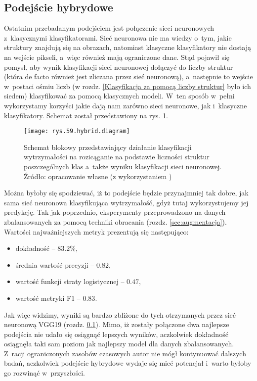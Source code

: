 \subsection{Podejście hybrydowe}
\label{binary.ann.with.structures}

Ostatnim przebadanym podejściem jest połączenie sieci neuronowych z~klasycznymi klasyfikatorami. Sieć neuronowa nie ma wiedzy o~tym, jakie struktury znajdują się na obrazach, natomiast klasyczne klasyfikatory nie dostają na wejście pikseli, a~więc również mają ograniczone dane. Stąd pojawił się pomysł, aby wynik klasyfikacji sieci neuronowej dołączyć do liczby struktur (która de facto również jest zliczana przez sieć neuronową), a~następnie to wejście w~postaci ośmiu liczb (w rozdz. \ref{Klasyfikacja za pomocą liczby struktur} było ich siedem) klasyfikować za pomocą klasycznych modeli. W~ten sposób w~pełni wykorzystamy korzyści jakie dają nam zarówno sieci neuronowe, jak i~klasyczne klasyfikatory. Schemat został przedstawiony na rys. \ref{rys.59.hybrid.diagram}. 
\begin{figure}[h]
    \centering
    \texttt{[image: rys.59.hybrid.diagram]}
    \caption{Schemat blokowy przedstawiający działanie klasyfikacji wytrzymałości na rozicąganie na podstawie liczności struktur poszczególnych klas a~także wyniku klasyfikacji sieci neuronowej. Źródło: opracowanie własne (z wykorzystaniem )}
    \label{rys.59.hybrid.diagram}
\end{figure}
Można byłoby się spodziewać, iż to podejście będzie przynajmniej tak dobre, jak sama sieć neuronowa klasyfikująca wytrzymałość, gdyż tutaj wykorzystujemy jej predykcję. Tak jak poprzednio, eksperymenty przeprowadzono na danych zbalansowanych za pomocą techniki obracania (rozdz. \ref{sec:augmentacja}). Wartości najważniejszych metryk prezentują się następująco:
\begin{itemize}
	\item dokładność – $83.2\%$,
	\item średnia wartość precyzji – $0.82$,
	\item wartość funkcji straty logistycznej – $0.47$,
	\item wartość metryki F1 – $0.83$.
\end{itemize}
Jak więc widzimy, wyniki są bardzo zbliżone do tych otrzymanych przez sieć neuronową VGG19 (rozdz. \ref{binary.ann.with.structures}). Mimo, iż zostały połączone dwa najlepsze podejścia nie udało się osiągnąć lepszych wyników, aczkolwiek dokładność osiągnęła taki sam poziom jak najlepszy model dla danych zbalansowanych. Z~racji ograniczonych zasobów czasowych autor nie mógł kontynuować dalszych badań, aczkolwiek podejście hybrydowe wydaje się mieć potencjał i~warto byłoby go rozwinąć w~przyszłości.
